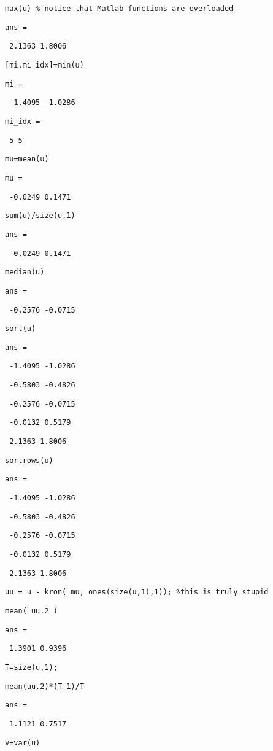 \documentclass[12pt,a4paper]{article}
\begin{document}
\texttt{max(u) \% notice that Matlab functions are overloaded}

\texttt{ans =}

\texttt{\ 2.1363 1.8006}

\texttt{[mi,mi\_idx]=min(u)}

\texttt{mi =}

\texttt{\ -1.4095 -1.0286}

\texttt{mi\_idx =}

\texttt{\ 5 5}

\texttt{mu=mean(u)}

\texttt{mu =}

\texttt{\ -0.0249 0.1471}

\texttt{sum(u)/size(u,1)}

\texttt{ans =}

\texttt{\ -0.0249 0.1471}

\texttt{median(u)}

\texttt{ans =}

\texttt{\ -0.2576 -0.0715}

\texttt{sort(u)}

\texttt{ans =}

\texttt{\ -1.4095 -1.0286}

\texttt{\ -0.5803 -0.4826}

\texttt{\ -0.2576 -0.0715}

\texttt{\ -0.0132 0.5179}

\texttt{\ 2.1363 1.8006}

\texttt{sortrows(u)}

\texttt{ans =}

\texttt{\ -1.4095 -1.0286}

\texttt{\ -0.5803 -0.4826}

\texttt{\ -0.2576 -0.0715}

\texttt{\ -0.0132 0.5179}

\texttt{\ 2.1363 1.8006}

\texttt{uu = u - kron( mu, ones(size(u,1),1)); \%this is truly stupid}

\texttt{mean( uu.2 )}

\texttt{ans =}

\texttt{\ 1.3901 0.9396}

\texttt{T=size(u,1);}

\texttt{mean(uu.2)*(T-1)/T}

\texttt{ans =}

\texttt{\ 1.1121 0.7517}

\texttt{v=var(u)}
\end{document}
